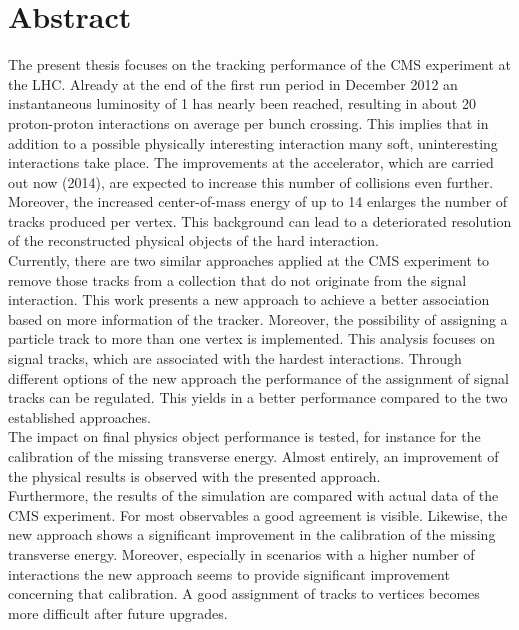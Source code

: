 \chapter*{Abstract}

The present thesis focuses on the tracking performance of the CMS experiment at the LHC. Already at the end of the first run period in December 2012 an instantaneous luminosity of 1\percms{} has nearly been reached, resulting in about 20 proton-proton interactions on average per bunch crossing. This implies that in addition to a possible physically interesting interaction many soft, uninteresting interactions take place. The improvements at the accelerator, which are carried out now (2014), are expected to increase this number of collisions even further. Moreover, the increased center-of-mass energy of up to 14\TeV{} enlarges the number of tracks produced per vertex. This background can lead to a deteriorated resolution of the reconstructed physical objects of the hard interaction.\\
Currently, there are two similar approaches applied at the CMS experiment to remove those tracks from a collection that do not originate from the signal interaction. This work presents a new approach to achieve a better association based on more information of the tracker. Moreover, the possibility of assigning a particle track to more than one vertex is implemented. This analysis focuses on signal tracks, which are associated with the hardest interactions. Through different options of the new approach the performance of the assignment of signal tracks can be regulated. This yields in a better performance compared to the two established approaches. \\
The impact on final physics object performance is tested, for instance for the calibration of the missing transverse energy. Almost entirely, an improvement of the physical results is observed with the presented approach. \\
Furthermore, the results of the simulation are compared with actual data of the CMS experiment. For most observables a good agreement is visible. Likewise, the new approach shows a significant improvement in the calibration of the missing transverse energy. Moreover, especially in scenarios with a higher number of interactions the new approach seems to provide significant improvement concerning that calibration. A good assignment of tracks to vertices becomes more difficult after future upgrades.
